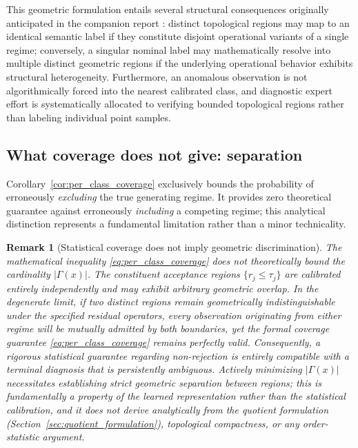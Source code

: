 \documentclass[a4paper]{cas-sc}
\newtheorem{remark}{Remark}
\newcommand{\residual}{\ensuremath{r}}
\begin{document}
This geometric formulation entails several structural consequences originally anticipated in the companion report \citep{disanti2026inverse}: distinct topological regions may map to an identical semantic label if they constitute disjoint operational variants of a single regime; conversely, a singular nominal label may mathematically resolve into multiple distinct geometric regions if the underlying operational behavior exhibits structural heterogeneity. Furthermore, an anomalous observation is not algorithmically forced into the nearest calibrated class, and diagnostic expert effort is systematically allocated to verifying bounded topological regions rather than labeling individual point samples.

\subsection{What coverage does not give: separation}
\label{subsec:coverage_not_separation}

Corollary~\ref{cor:per_class_coverage} exclusively bounds the probability of erroneously \emph{excluding} the true generating regime. It provides zero theoretical guarantee against erroneously \emph{including} a competing regime; this analytical distinction represents a fundamental limitation rather than a minor technicality.

\begin{remark}[Statistical coverage does not imply geometric discrimination]
\label{rem:coverage_not_discrimination}
The mathematical inequality \eqref{eq:per_class_coverage} does not theoretically bound the cardinality \(|\Gamma(x)|\). The constituent acceptance regions \(\{\residual_j\le\tau_j\}\) are calibrated entirely independently and may exhibit arbitrary geometric overlap. In the degenerate limit, if two distinct regions remain geometrically indistinguishable under the specified residual operators, every observation originating from either regime will be mutually admitted by both boundaries, yet the formal coverage guarantee \eqref{eq:per_class_coverage} remains perfectly valid. Consequently, a rigorous statistical guarantee regarding non-rejection is entirely compatible with a terminal diagnosis that is persistently ambiguous. Actively minimizing \(|\Gamma(x)|\) necessitates establishing strict geometric \emph{separation} between regions; this is fundamentally a property of the learned representation rather than the statistical calibration, and it does not derive analytically from the quotient formulation (Section~\ref{sec:quotient_formulation}), topological compactness, or any order-statistic argument.
\end{remark}
\end{document}
